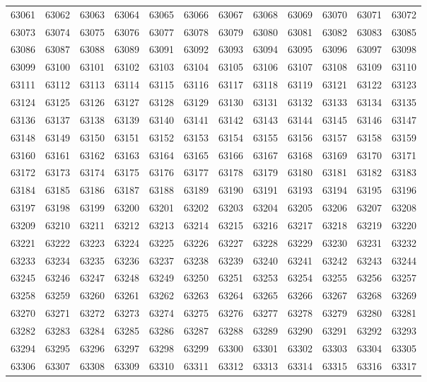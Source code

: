 \begin{center}
\begin{longtable}{llllllllllll}
63061 &63062 &63063 &63064 &63065 &63066 &63067 &63068 &63069 &63070 &63071 &63072 \\
63073 &63074 &63075 &63076 &63077 &63078 &63079 &63080 &63081 &63082 &63083 &63085 \\
63086 &63087 &63088 &63089 &63091 &63092 &63093 &63094 &63095 &63096 &63097 &63098 \\
63099 &63100 &63101 &63102 &63103 &63104 &63105 &63106 &63107 &63108 &63109 &63110 \\
63111 &63112 &63113 &63114 &63115 &63116 &63117 &63118 &63119 &63121 &63122 &63123 \\
63124 &63125 &63126 &63127 &63128 &63129 &63130 &63131 &63132 &63133 &63134 &63135 \\
63136 &63137 &63138 &63139 &63140 &63141 &63142 &63143 &63144 &63145 &63146 &63147 \\
63148 &63149 &63150 &63151 &63152 &63153 &63154 &63155 &63156 &63157 &63158 &63159 \\
63160 &63161 &63162 &63163 &63164 &63165 &63166 &63167 &63168 &63169 &63170 &63171 \\
63172 &63173 &63174 &63175 &63176 &63177 &63178 &63179 &63180 &63181 &63182 &63183 \\
63184 &63185 &63186 &63187 &63188 &63189 &63190 &63191 &63193 &63194 &63195 &63196 \\
63197 &63198 &63199 &63200 &63201 &63202 &63203 &63204 &63205 &63206 &63207 &63208 \\
63209 &63210 &63211 &63212 &63213 &63214 &63215 &63216 &63217 &63218 &63219 &63220 \\
63221 &63222 &63223 &63224 &63225 &63226 &63227 &63228 &63229 &63230 &63231 &63232 \\
63233 &63234 &63235 &63236 &63237 &63238 &63239 &63240 &63241 &63242 &63243 &63244 \\
63245 &63246 &63247 &63248 &63249 &63250 &63251 &63253 &63254 &63255 &63256 &63257 \\
63258 &63259 &63260 &63261 &63262 &63263 &63264 &63265 &63266 &63267 &63268 &63269 \\
63270 &63271 &63272 &63273 &63274 &63275 &63276 &63277 &63278 &63279 &63280 &63281 \\
63282 &63283 &63284 &63285 &63286 &63287 &63288 &63289 &63290 &63291 &63292 &63293 \\
63294 &63295 &63296 &63297 &63298 &63299 &63300 &63301 &63302 &63303 &63304 &63305 \\
63306 &63307 &63308 &63309 &63310 &63311 &63312 &63313 &63314 &63315 &63316 &63317 \\

\end{longtable}
\end{center}
